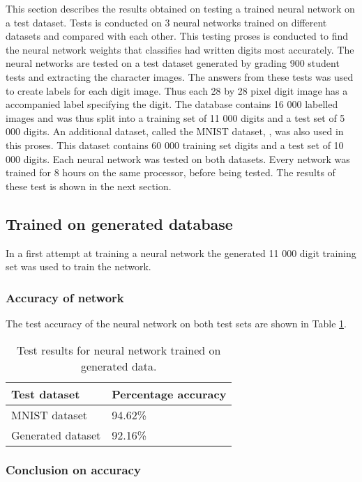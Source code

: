 This section describes the results obtained on testing a trained neural network on a test dataset. Tests is conducted on 3 neural networks trained on different datasets and compared with each other. This testing proses is conducted to find the neural network weights that classifies had written digits most accurately. The neural networks are tested on a test dataset generated by grading 900 student tests and extracting the character images. The answers from these tests was used to create labels for each digit image. Thus each 28 by 28 pixel digit image has a accompanied label specifying the digit. The database contains 16 000 labelled images and was thus split into a training set of 11 000 digits and a test set of 5 000 digits. An additional dataset, called the MNIST dataset, \citep{mnist}, was also used in this proses. This dataset contains 60 000 training set digits and a test set of 10 000 digits. Each neural network was tested on both datasets. Every network was trained for 8 hours on the same processor, before being tested. The results of these test is shown in the next section.
\subsection{Trained on generated database}
In a first attempt at training a neural network the generated 11 000 digit training set was used to train the network.

\subsubsection{Accuracy of network}

The test accuracy of the neural network on both test sets are shown in Table \ref{tbl:nnResult1}.

\begin{table}
\caption{Test results for neural network trained on generated data.} \label{tbl:nnResult1}
  \centering
\begin{tabular}{|p{4cm}|p{5cm}|}
\hline
\textbf{Test dataset}&\textbf{Percentage accuracy}\\
\hline
MNIST dataset&94.62\%\\
\hline
Generated dataset&92.16\%\\
\hline
\end{tabular}
\end{table}

\subsubsection{Conclusion on accuracy}

